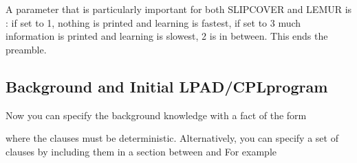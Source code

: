 \documentclass[letterpaper,10pt,english]{sphinxmanual}
\begin{document}
\sphinxAtStartPar
A parameter that is particularly important for both SLIPCOVER and LEMUR is : if set to 1, nothing is printed and learning is fastest, if set to 3 much information is printed and learning is slowest, 2 is in between. This ends the preamble.


\subsection{Background and Initial LPAD/CPL\sphinxhyphen{}program}
\label{\detokenize{index:background-and-initial-lpad-cpl-program}}
\sphinxAtStartPar
Now you can specify the background knowledge with a fact of the form

\begin{sphinxVerbatim}[commandchars=\\\{\}]
    
\end{sphinxVerbatim}

\sphinxAtStartPar
where the clauses must be deterministic.
Alternatively, you can specify a set of clauses by including them in a section between  and 
For example

\begin{sphinxVerbatim}[commandchars=\\\{\}]
 

 
 

 
\end{sphinxVerbatim}
\end{document}
